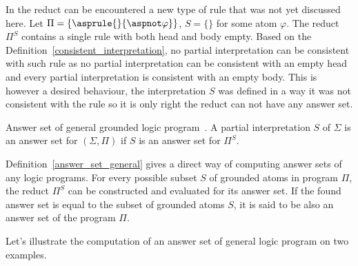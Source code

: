 \begin{example}
    In the reduct can be encountered a new type of rule that was not yet discussed here.
    Let $\Pi = \{\asprule{}{\aspnot \varphi}\}$, $S = \{\}$ for some atom $\varphi$.
    The reduct $\Pi^S$ contains
    a single rule with both head and body empty.
    Based on the Definition~\ref{consistent_interpretation},
    no partial interpretation can be consistent
    with such rule as no partial interpretation can be consistent with an empty head
    and every partial interpretation is consistent with an empty body.
    This is however a desired behaviour, the interpretation $S$ was defined
    in a way it was not consistent with the rule so it is only right
    the reduct can not have any answer set.
\end{example}

\begin{definition}{Answer set of general grounded logic program~\cite{KRHandbook}.}%
    \label{answer_set_general}
    A partial interpretation $S$ of $\Sigma$ is an answer set for $(\Sigma, \Pi)$
    if $S$ is an answer set for $\Pi^S$.
\end{definition}

Definition~\ref{answer_set_general} gives a direct way of computing answer sets
of any logic programs. For every possible subset $S$ of grounded atoms in program $\Pi$,
the reduct $\Pi^S$ can be constructed and evaluated for its answer set.
If the found answer set is equal to the subset of grounded atoms $S$, it is said
to be also an answer set of the program $\Pi$.

Let's illustrate the computation of an answer set of general logic program on two examples.


